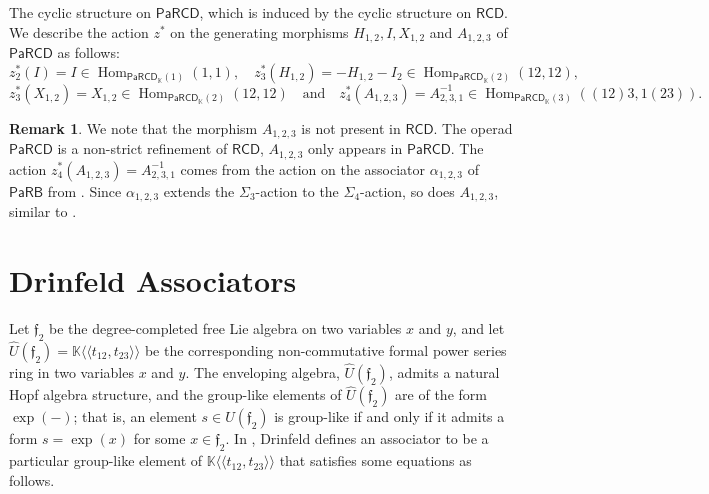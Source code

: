 \documentclass{amsart}
\newcommand{\chandan}[1]{\todo[color=yellow!90!black]{\rm #1 \\ \hfill --- C.}}
\newcommand{\marcy}[1]{\todo[color=magenta!30]{\rm #1 \\ \hfill --- M.}}
\newcommand{\kk}{\mathbb{K}}    %
\newcommand{\PaRB}{\mathsf{PaRB}}
\newcommand{\PaRCD}{\mathsf{PaRCD}}
\newcommand{\RCD}{\mathsf{RCD}}
\newcommand{\hPaRCD}{{\PaRCD}_{\kk}}
\newcommand{\Hom}{\operatorname{Hom}}
\newcommand{\ff}{\mathfrak{f}}
\newtheorem{cor}[theorem]{Corollary}%
\theoremstyle{definition}
\newtheorem{remark}[theorem]{Remark}%
\numberwithin{equation}{section}
\begin{document}
The cyclic structure on $\PaRCD$, which is induced by the cyclic structure on $\RCD$. We describe the action $z^*$ on the generating morphisms $H_{1,2},I, X_{1,2}$ and $A_{1,2,3}$ of $\PaRCD$ as follows: \[ z_2^*(I) = I \in \Hom_{\hPaRCD(1)}(1,1), \quad z_3^*(H_{1,2})= -H_{1,2}-I_2 \in \Hom_{\hPaRCD(2)}(12,12),\] \[ z_3^*(X_{1,2})= X_{1,2} \in \Hom_{\hPaRCD(2)}(12,12) \quad \text{and} \quad z_4^*(A_{1,2,3}) = A^{-1}_{2,3,1}\in \Hom_{\hPaRCD(3)}((12)3,1(23)).\]



\begin{remark}
We note that the morphism $A_{1,2,3}$ is not present in $\RCD$. The operad $\PaRCD$ is a non-strict refinement of $\RCD$, $A_{1,2,3}$ only appears in $\PaRCD$. The action $z_4^*(A_{1,2,3}) = A^{-1}_{2,3,1}$ comes from the action on the associator $\alpha_{1,2,3}$ of $\PaRB$ from \cite[Section 3]{campos2019configuration}. Since $\alpha_{1,2,3}$ extends the $\Sigma_3$-action to the $\Sigma_4$-action, so does $A_{1,2,3}$, similar to \cite[Lemma 4.7]{RS2025cyclicgt}. 
\end{remark}
\section{Drinfeld Associators}\label{sec:Associators}

Let $\ff_2$ be the degree-completed free Lie algebra on two variables $x$ and $y$, and let $\hat{U}(\ff_2)= \kk\langle\langle t_{12},t_{23}\rangle\rangle$ be the corresponding non-commutative formal power series ring in two variables $x$ and $y$.  The enveloping algebra, $\hat{U}(\ff_2)$, admits a natural Hopf algebra structure, and the group-like elements of $\hat{U}(\ff_2)$ are of the form $\exp(-)$; that is, an element $s \in \hat{U}(\ff_2)$ is group-like if and only if it admits a form $s = \exp(x)$ for some $x \in \ff_2$. In \cite{Drin}, Drinfeld  defines an associator to be a particular group-like element of $\kk\langle\langle t_{12},t_{23}\rangle\rangle$ that satisfies some equations as follows.
\end{document}
